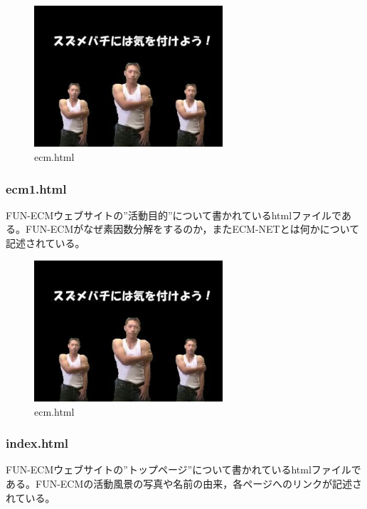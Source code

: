 \documentclass[openany,11pt,papersize]{jsbook}
\begin{document}
\begin{figure}[H]
  \begin{center} %
    \includegraphics[clip, width=7.0cm]{./figure/smile.png}
    \caption{ecm.html} %
    \label{ecm} %
  \end{center}
\end{figure}

\subsubsection{ecm1.html}
FUN-ECMウェブサイトの”活動目的”について書かれているhtmlファイルである。FUN-ECMがなぜ素因数分解をするのか，またECM-NETとは何かについて記述されている。

\begin{figure}[H]
  \begin{center} %
    \includegraphics[clip, width=7.0cm]{./figure/smile.png}
    \caption{ecm.html} %
    \label{ecm} %
  \end{center}
\end{figure}

\subsubsection{index.html}
FUN-ECMウェブサイトの”トップページ”について書かれているhtmlファイルである。FUN-ECMの活動風景の写真や名前の由来，各ページへのリンクが記述されている。
\end{document}
